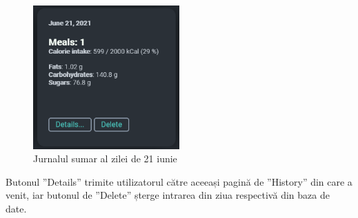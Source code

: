 \begin{figure}[!htb]
	\centering
	\includegraphics[width=0.5\textwidth]
	{../LaTeX/Images/App/history_today.PNG}
	\caption{Jurnalul sumar al zilei de 21 iunie}
	\label{fig:718}
\end{figure}

Butonul ”Details” trimite utilizatorul către aceeași pagină de ”History” din care a venit, iar butonul de ”Delete” șterge intrarea din ziua respectivă din baza de date.
